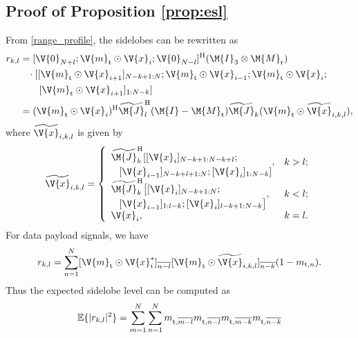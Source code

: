 \documentclass[journal,a4paper,10pt, romanappendices]{IEEEtran}
\begin{document}
\subsection{Proof of Proposition \ref{prop:esl}}\label{sec:proof_esl}
\begin{IEEEproof}
From \eqref{range_profile}, the sidelobes can be rewritten as
\begin{align}
r_{k,l} &= [\V{0}_{N+l};\V{m}_{\rm t}\odot\V{x}_i;\V{0}_{N-l}]^{\rm H} (\M{I}_3\otimes \M{M}_{\rm r}) \nonumber\\
&\hspace{3mm}\cdot [[\V{m}_{\rm t}\odot \V{x}_{i+1}]_{N-k+1:N};\V{m}_{\rm t}\odot \V{x}_{i-1};\V{m}_{\rm t}\odot\V{x}_i;\nonumber \\
&\hspace{7mm}[\V{m}_{\rm t}\odot \V{x}_{i+1}]_{1:N-k}] \nonumber \\
&=(\V{m}_{\rm t}\odot \V{x}_i)^{\rm H}\widetilde{\M{J}}_l^{\rm H} (\M{I}-\M{M}_{\rm t}) \widetilde{\M{J}}_k(\V{m}_{\rm t}\odot \widetilde{\V{x}}_{i,k,l}),
\end{align}
where $\widetilde{\V{x}}_{i,k,l}$ is given by
$$
\widetilde{\V{x}}_{i,k,l}= \left\{
  \begin{array}{ll}
    \begin{aligned}
    &\widetilde{\M{J}}_k^{\rm H}[[\V{x}_i]_{N-k+1:N-k+l};\\
    &\hspace{3mm}[\V{x}_{i-1}]_{N-k+l+1:N};[\V{x}_i]_{1:N-k}]
    \end{aligned}, & \hbox{$k>l$;} \\
    \begin{aligned}
    &\widetilde{\M{J}}_k^{\rm H}\big[ [\V{x}_i]_{N-k+1:N};\\
    &\hspace{3mm}[\V{x}_{i-1}]_{1:l-k};[\V{x}_i]_{l-k+1:N-k}\big]
    \end{aligned}, & \hbox{$k<l$;}\\
    \V{x}_i, & \hbox{$k=l$.}
  \end{array}
\right.
$$
For data payload signals, we have
$$
r_{k,l} = \sum_{n=1}^N [\V{m}_{\rm t}\odot \V{x}_i^*]_{\overline{n-l}} [\V{m}_{\rm t}\odot \widetilde{\V{x}}_{i,k,l}]_{\overline{n-k}} (1-m_{{\rm t},n}).
$$
Thus the expected sidelobe level can be computed as
$$
\begin{aligned}
\mathbb{E}\{|r_{k,l}|^2\} &= \sum_{m=1}^{N} \sum_{n=1}^N m_{{\rm t},\overline{m-l}}m_{{\rm t},\overline{n-l}}m_{{\rm t},\overline{m-k}}m_{{\rm t},\overline{n-k}}\\

\end{aligned}$$
\end{IEEEproof}
\end{document}
